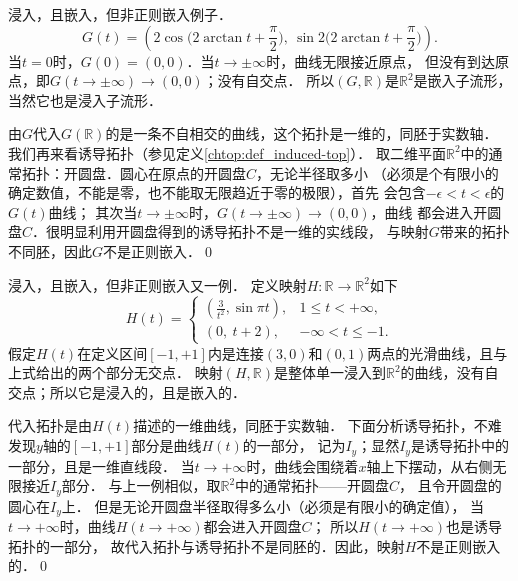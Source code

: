 \begin{example}\label{chdm:exm_iec2}
    浸入，且嵌入，但非正则嵌入例子．
    \begin{equation}\label{chdm:eqn_tmp-g-embed}
      G(t)=\left(2\cos\Big(2\arctan t+\frac{\pi}{2}\Big),\ \sin2\Big(2 \arctan t+\frac{\pi}{2}\Big) \right) . 
    \end{equation}    
        当$t=0$时，$G(0)=(0,0)$．当$t\to \pm \infty$时，曲线无限接近原点，
    但没有到达原点，即$G(t\to \pm \infty)\to (0,0)$；没有自交点．
    所以$(G,\mathbb{R})$是$\mathbb{R}^2$是嵌入子流形，当然它也是浸入子流形．

    由$G$代入$G(\mathbb{R})$的是一条不自相交的曲线，这个拓扑是一维的，同胚于实数轴．
    我们再来看诱导拓扑（参见定义\ref{chtop:def_induced-top}）．
    取二维平面$\mathbb{R}^2$中的通常拓扑：开圆盘．圆心在原点的开圆盘$C$，无论半径取多小
    （必须是个有限小的确定数值，不能是零，也不能取无限趋近于零的极限），首先
    会包含$-\epsilon < t< \epsilon$的$G(t)$曲线；
    其次当$t\to \pm \infty$时，$G(t\to \pm \infty)\to (0,0)$，曲线
    都会进入开圆盘$C$．很明显利用开圆盘得到的诱导拓扑不是一维的实线段，
    与映射$G$带来的拓扑不同胚，因此$G$不是正则嵌入．\qed
\end{example}



\begin{example}\label{chdm:exm_iec3}
    浸入，且嵌入，但非正则嵌入又一例．
    定义映射$H:\mathbb{R}\to \mathbb{R}^2$如下
    \begin{equation}
        H(t)=\begin{cases}
           \left(\frac{3}{t^2},\sin\pi t \right), & 1 \leqslant t < +\infty, \\
           \left(0,\ t+2\right), & -\infty < t \leqslant -1.
        \end{cases}
    \end{equation}
    假定$H(t)$在定义区间$[-1,+1]$内是连接$(3,0)$和$(0,1)$两点的光滑曲线，且与上式给出的两个部分无交点．
    映射$(H,\mathbb{R})$是整体单一浸入到$\mathbb{R}^2$的曲线，没有自交点；所以它是浸入的，且是嵌入的．
    
    代入拓扑是由$H(t)$描述的一维曲线，同胚于实数轴．
    下面分析诱导拓扑，不难发现$y$轴的$[-1,+1]$部分是曲线$H(t)$的一部分，
    记为$I_y$；显然$I_y$是诱导拓扑中的一部分，且是一维直线段．
    当$t\to +\infty$时，曲线会围绕着$x$轴上下摆动，从右侧无限接近$I_y$部分．
    与上一例相似，取$\mathbb{R}^2$中的通常拓扑——开圆盘$C$，
    且令开圆盘的圆心在$I_y$上．
    但是无论开圆盘半径取得多么小（必须是有限小的确定值），
    当$t\to +\infty$时，曲线$H(t\to +\infty)$都会进入开圆盘$C$；
    所以$H(t\to +\infty)$也是诱导拓扑的一部分，
    故代入拓扑与诱导拓扑不是同胚的．因此，映射$H$不是正则嵌入的．\qed
\end{example}

